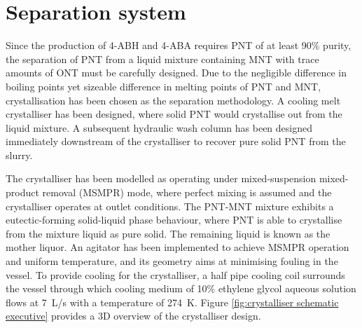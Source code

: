 \section*{Separation system}

Since the production of 4-ABH and 4-ABA requires PNT of at least 90\% purity, the separation of PNT from a liquid mixture containing MNT with trace amounts of ONT must be carefully designed. Due to the negligible difference in boiling points yet sizeable difference in melting points of PNT and MNT, crystallisation has been chosen as the separation methodology. A cooling melt crystalliser has been designed, where solid PNT would crystallise out from the liquid mixture. A subsequent hydraulic wash column has been designed immediately downstream of the crystalliser to recover pure solid PNT from the slurry. 



The crystalliser has been modelled as operating under mixed-suspension mixed-product removal (MSMPR) mode, where perfect mixing is assumed and the crystalliser operates at outlet conditions. The PNT-MNT mixture exhibits a eutectic-forming solid-liquid phase behaviour, where PNT is able to crystallise from the mixture liquid as pure solid. The remaining liquid is known as the mother liquor. An agitator has been implemented to achieve MSMPR operation and uniform temperature, and its geometry aims at minimising fouling in the vessel. To provide cooling for the crystalliser, a half pipe cooling coil surrounds the vessel through which cooling medium of 10\% ethylene glycol aqueous solution flows at \SI{7}{L/s} with a temperature of \SI{274}{K}. Figure \ref{fig:crystalliser schematic executive} provides a 3D overview of the crystalliser design.

